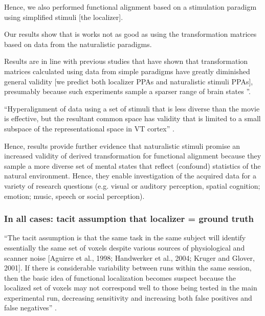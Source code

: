 %
Hence, we also performed functional alignment based on a stimulation paradigm
using simplified stimuli [the localizer].

%
Our results show that is works not as good as using the transformation matrices
based on data from the naturalistic paradigms.

%
Results are in line with previous studies \citep{haxby2011common,
guntupalli2016model} that have shown that transformation matrices calculated
using data from simple paradigms have greatly diminished general validity [we
predict both localizer PPAs and naturalistic stimuli PPAs], presumably because
such experiments sample a sparser range of brain states
\citep{guntupalli2016model}''.

%
``Hyperalignment of data using a set of stimuli that is less diverse than the
movie is effective, but the resultant common space has validity that is limited
to a small subspace of the representational space in VT cortex''
\citep{haxby2011common}.

%
Hence, results provide further evidence that naturalistic stimuli promise an
increased validity of derived transformation for functional alignment
%
because they sample a more diverse set of mental states that reflect (confound)
statistics of the natural environment.
%
Hence, they enable investigation of the acquired data for a variety of research
questions (e.g.  visual or auditory perception, spatial cognition; emotion;
music, speech or social perception).


\subsubsection{In all cases: tacit assumption that localizer = ground truth}


``The tacit assumption is that the same task in the same subject will identify
essentially the same set of voxels despite various sources of physiological and
scanner noise [Aguirre et al., 1998; Handwerker et al., 2004; Kruger and Glover,
2001].
%
If there is considerable variability between runs within the same session, then
the basic idea of functional localization becomes suspect because the localized
set of voxels may not correspond well to those being tested in the main
experimental run, decreasing sensitivity and increasing both false positives and
false negatives'' \citep{duncan2009consistency}.


